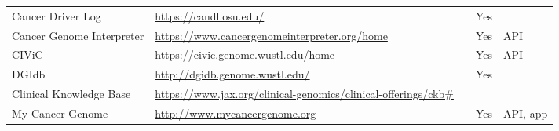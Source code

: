 \documentclass[10pt,letterpaper]{article}
\begin{document}
\begin{table}[p]
\centering
\begin{tabularx}{\textwidth}{p{3cm}XXp{1.5cm}p{1.5cm}}
  \hline
  Cancer Driver Log & \url{https://candl.osu.edu/} & \cite{Damodaran2015-so} & Yes & \\
  Cancer Genome Interpreter & \url{https://www.cancergenomeinterpreter.org/home} & \cite{Tamborero2017-ay} & Yes & API \\
  CIViC & \url{https://civic.genome.wustl.edu/home} & \cite{Griffith2016-sy} & Yes & API \\
  DGIdb & \url{http://dgidb.genome.wustl.edu/} & \cite{Wagner2016-fs,Griffith2013-uv} & Yes & \\
  Clinical Knowledge Base & \url{https://www.jax.org/clinical-genomics/clinical-offerings/ckb\#} & & & \\
  My Cancer Genome & \url{http://www.mycancergenome.org} & \cite{Micheel2014-pz} & Yes & API, app \\
 
 
 
 
 
 
 
 
 
 
 
 
 
 
 
 

\end{tabularx}
\end{table}
\end{document}
